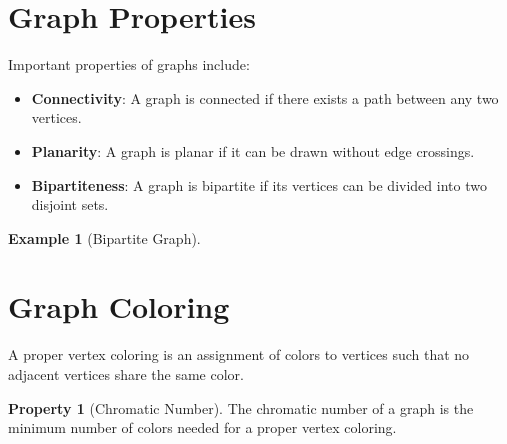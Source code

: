 \documentclass[12pt,a4paper]{article}
\theoremstyle{definition}
\newtheorem{property}[definition]{Property}
\newtheorem{example}[definition]{Example}
\begin{document}
\section{Graph Properties}

\begin{tcolorbox}[theorembox]
Important properties of graphs include:
\begin{itemize}
    \item \textbf{Connectivity}: A graph is connected if there exists a path between any two vertices.
    \item \textbf{Planarity}: A graph is planar if it can be drawn without edge crossings.
    \item \textbf{Bipartiteness}: A graph is bipartite if its vertices can be divided into two disjoint sets.
\end{itemize}
\end{tcolorbox}

\begin{example}[Bipartite Graph]
\begin{center}
\end{center}
\end{example}

\section{Graph Coloring}
\begin{tcolorbox}[theorembox]
A proper vertex coloring is an assignment of colors to vertices such that no adjacent vertices share the same color.
\end{tcolorbox}

\begin{center}
\end{center}

\begin{property}[Chromatic Number]
The chromatic number of a graph is the minimum number of colors needed for a proper vertex coloring.
\end{property}
\end{document}
